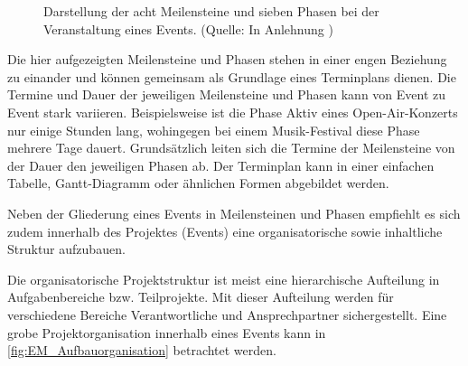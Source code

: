 \begin{figure}[H]
    \centering
    \setlength{\fboxsep}{10pt}
    \setlength{\fboxrule}{0.5pt}
    \caption[Eventmanagement: Meilensteine und Phase eines Events]{Darstellung der acht Meilensteine und sieben Phasen bei der Veranstaltung eines Events. (Quelle: In Anlehnung \autocite[Vgl.][S. 23]{Holzbaur.2002})} \label{fig:EM_PH_MS}
\end{figure}

Die hier aufgezeigten Meilensteine und Phasen stehen in einer engen Beziehung zu einander und können gemeinsam als Grundlage eines Terminplans dienen. Die Termine und Dauer der jeweiligen Meilensteine und Phasen kann von Event zu Event stark variieren. Beispielsweise ist die Phase Aktiv eines Open-Air-Konzerts nur einige Stunden lang, wohingegen bei einem Musik-Festival diese Phase mehrere Tage dauert. Grundsätzlich leiten sich die Termine der Meilensteine von der Dauer den jeweiligen Phasen ab. Der Terminplan kann in einer einfachen Tabelle, Gantt-Diagramm oder ähnlichen Formen abgebildet werden.\autocite[Vgl.][S. 24 ff.]{Holzbaur.2002}

Neben der Gliederung eines Events in Meilensteinen und Phasen empfiehlt es sich zudem innerhalb des Projektes (Events) eine organisatorische sowie inhaltliche Struktur aufzubauen.

Die organisatorische Projektstruktur ist meist eine hierarchische Aufteilung in Aufgabenbereiche bzw. Teilprojekte. Mit dieser Aufteilung werden für verschiedene Bereiche Verantwortliche und Ansprechpartner sichergestellt. Eine grobe Projektorganisation innerhalb eines Events kann in \autoref{fig:EM_Aufbauorganisation} betrachtet werden. 

